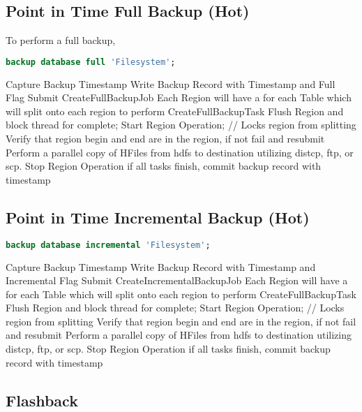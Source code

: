 \subsection{Point in Time Full Backup (Hot)}

To perform a full backup,

\begin{lstlisting}[frame=single,captionpos=b,language=SQL,caption=Procedure to
Perform a Full Backup] backup database full 'Filesystem';
\end{lstlisting}

Capture Backup Timestamp
Write Backup Record with Timestamp and Full Flag
Submit CreateFullBackupJob 
Each Region will have a 
for each Table which will split onto each region to
perform CreateFullBackupTask 
	Flush Region and block thread for complete;
	Start Region Operation; // Locks region from splitting
	Verify that region begin and end are in the region, if not fail and resubmit
	Perform a parallel copy of HFiles from hdfs to destination utilizing distcp,
	ftp, or scp.
	Stop Region Operation
if all tasks finish, commit backup record with timestamp

\subsection{Point in Time Incremental Backup (Hot)}
	
\begin{lstlisting}[frame=single,captionpos=b,language=SQL,caption=Procedure to
Perform a Full Backup] backup database incremental 'Filesystem';
\end{lstlisting}

Capture Backup Timestamp
Write Backup Record with Timestamp and Incremental Flag
Submit CreateIncrementalBackupJob 
Each Region will have a 
for each Table which will split onto each region to
perform CreateFullBackupTask 
	Flush Region and block thread for complete;
	Start Region Operation; // Locks region from splitting
	Verify that region begin and end are in the region, if not fail and resubmit
	Perform a parallel copy of HFiles from hdfs to destination utilizing distcp,
	ftp, or scp.
	Stop Region Operation
if all tasks finish, commit backup record with timestamp




\subsection{Flashback}


